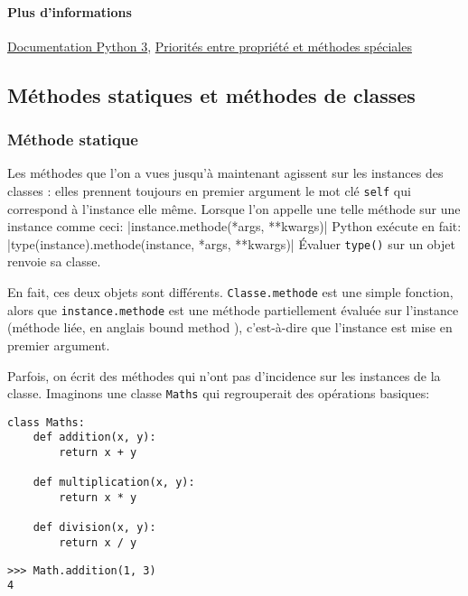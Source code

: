 \paragraph{Plus d'informations}\href{https://docs.python.org/fr/3/library/functions.html?highlight=property#property}{Documentation Python 3}, \href{https://stackoverflow.com/questions/15750522/class-properties-and-setattr/15751159#15751159}{Priorités entre propriété et méthodes spéciales}

\subsection{Méthodes statiques et méthodes de classes}
\subsubsection{Méthode statique}
\label{sec:staticmethod}

Les méthodes que l'on a vues jusqu'à maintenant agissent sur les instances des classes : elles prennent toujours en premier argument le mot clé \texttt{self} qui correspond à l'instance elle même. Lorsque l'on appelle une telle méthode sur une instance comme ceci:
|instance.methode(*args, **kwargs)|
Python exécute en fait: |type(instance).methode(instance, *args, **kwargs)|
Évaluer \texttt{type()} sur un objet renvoie sa classe.\bigskip

En fait, ces deux objets sont différents. \texttt{Classe.methode} est une simple fonction, alors que \texttt{instance.methode} est une méthode partiellement évaluée sur l'instance (méthode liée, en anglais \og bound method \fg{}), c'est-à-dire que l'instance est mise en premier argument.\bigskip

Parfois, on écrit des méthodes qui n'ont pas d'incidence sur les instances de la classe. Imaginons une classe \texttt{Maths} qui regrouperait des opérations basiques:

\begin{verbatim}
class Maths:
    def addition(x, y):
        return x + y

    def multiplication(x, y):
        return x * y

    def division(x, y):
        return x / y
\end{verbatim}

\begin{verbatim}
>>> Math.addition(1, 3)
4
\end{verbatim}

